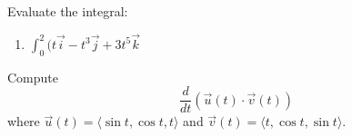 \documentclass[12pt]{amsart}
\begin{document}
\begin{question}
	Evaluate the integral:
	\begin{enumerate}
		\item $ \int_0^2 (t \vec{i} - t^3 \vec{j} + 3t^5 \vec{k} $
	\end{enumerate}
\end{question}
\vspace{7cm}

\begin{question}
	Compute
	\begin{equation*}
		\frac{d}{dt} ( \vec{u}(t) \cdot \vec{v}(t) )
	\end{equation*}
	where $\vec{u}(t) = \langle \sin t, \cos t, t \rangle$ and $\vec{v}(t) = \langle t, \cos t, \sin t \rangle$.
\end{question}
\vspace{7cm}
\end{document}
